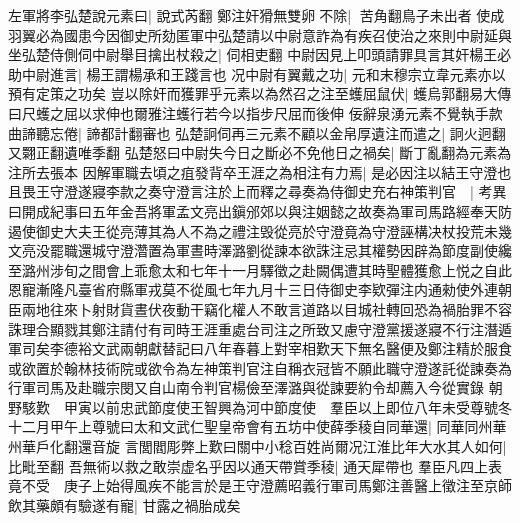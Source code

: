 左軍將李弘楚說元素曰|{
	說式芮翻}
鄭注奸猾無雙卵不除|{
	苦角翻鳥子未出者}
使成羽翼必為國患今因御史所劾匿軍中弘楚請以中尉意詐為有疾召使治之來則中尉延與坐弘楚侍側伺中尉舉目擒出杖殺之|{
	伺相吏翻}
中尉因見上叩頭請罪具言其奸楊王必助中尉進言|{
	楊王謂楊承和王踐言也}
况中尉有翼戴之功|{
	元和末穆宗立韋元素亦以預有定策之功矣}
豈以除奸而獲罪乎元素以為然召之注至蠖屈鼠伏|{
	蠖烏郭翻易大傳曰尺蠖之屈以求伸也爾雅注蠖行若今以指步尺屈而後伸}
佞辭泉湧元素不覺執手款曲諦聽忘倦|{
	諦都計翻審也}
弘楚詗伺再三元素不顧以金帛厚遺注而遣之|{
	詗火迥翻又翾正翻遺唯季翻}
弘楚怒曰中尉失今日之斷必不免他日之禍矣|{
	斷丁亂翻為元素為注所去張本}
因解軍職去頃之疽發背卒王涯之為相注有力焉|{
	是必因注以結王守澄也}
且畏王守澄遂寢李款之奏守澄言注於上而釋之尋奏為侍御史充右神策判官　|{
	考異曰開成紀事曰五年金吾將軍孟文亮出鎭邠郊以與注姻懿之故奏為軍司馬路經奉天防遏使御史大夫王從亮薄其為人不為之禮注毁從亮於守澄竟為守澄誣構决杖投荒未幾文亮没罷職還城守澄濳置為軍晝時澤潞劉從諫本欲誅注忌其權勢因辟為節度副使纔至潞州涉旬之間會上乖愈太和七年十一月驛徵之赴闕偶遭其時聖體獲愈上悦之自此恩寵漸隆凡臺省府縣軍戎莫不從風七年九月十三日侍御史李欵彈注内通勑使外連朝臣兩地往來卜射財貨晝伏夜動干竊化權人不敢言道路以目城社轉回恐為禍胎罪不容誅理合顯戮其鄭注請付有司時王涯重處台司注之所致又慮守澄黨援遂寢不行注潛遁軍司矣李德裕文武兩朝獻替記曰八年春暮上對宰相歎天下無名醫便及鄭注精於服食或欲置於翰林技術院或欲令為左神策判官注自稱衣冠皆不願此職守澄遂託從諫奏為行軍司馬及赴職宗閔又自山南令判官楊儉至澤潞與從諫要約令却薦入今從實錄}
朝野駭歎　甲寅以前忠武節度使王智興為河中節度使　羣臣以上即位八年未受尊號冬十二月甲午上尊號曰太和文武仁聖皇帝會有五坊中使薛季稜自同華還|{
	同華同州華州華戶化翻還音旋}
言閭閻彫弊上歎曰關中小稔百姓尚爾况江淮比年大水其人如何|{
	比毗至翻}
吾無術以救之敢崇虚名乎因以通天帶賞季稜|{
	通天犀帶也}
羣臣凡四上表竟不受　庚子上始得風疾不能言於是王守澄薦昭義行軍司馬鄭注善醫上徵注至京師飲其藥頗有驗遂有寵|{
	甘露之禍胎成矣}


